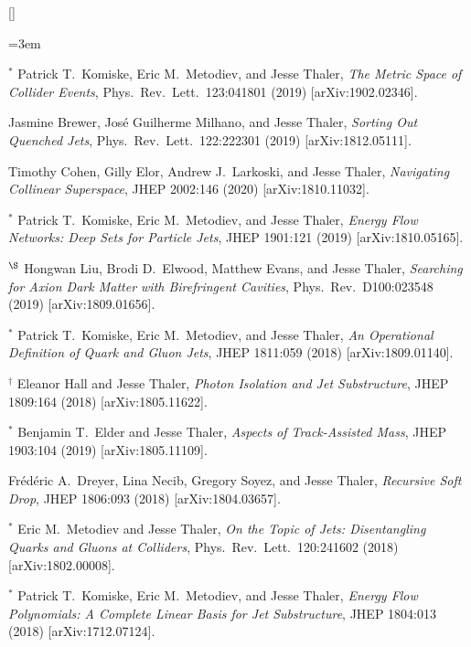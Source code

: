 \begin{list}{[]\addtocounter{jessecount}{-1}}{\leftmargin=3em \itemsep=4pt}
\item
${}^\ast$ Patrick T.\ Komiske, Eric M.\ Metodiev, and Jesse Thaler,
\emph{The Metric Space of Collider Events},
Phys.\ Rev.\ Lett.\ 123:041801 (2019)
[arXiv:1902.02346].

\item
 Jasmine Brewer, José Guilherme Milhano, and Jesse Thaler,
\emph{Sorting Out Quenched Jets},
Phys.\ Rev.\ Lett.\ 122:222301 (2019)
[arXiv:1812.05111].

\item
 Timothy Cohen, Gilly Elor, Andrew J.\ Larkoski, and Jesse Thaler,
\emph{Navigating Collinear Superspace},
JHEP 2002:146 (2020)
[arXiv:1810.11032].

\item
${}^\ast$ Patrick T.\ Komiske, Eric M.\ Metodiev, and Jesse Thaler,
\emph{Energy Flow Networks: Deep Sets for Particle Jets},
JHEP 1901:121 (2019)
[arXiv:1810.05165].

\item
${}^\S$ Hongwan Liu, Brodi D.\ Elwood, Matthew Evans, and Jesse Thaler,
\emph{Searching for Axion Dark Matter with Birefringent Cavities},
Phys.\ Rev.\ D100:023548 (2019)
[arXiv:1809.01656].

\item
${}^\ast$ Patrick T.\ Komiske, Eric M.\ Metodiev, and Jesse Thaler,
\emph{An Operational Definition of Quark and Gluon Jets},
JHEP 1811:059 (2018)
[arXiv:1809.01140].

\item
${}^\dagger$ Eleanor Hall and Jesse Thaler,
\emph{Photon Isolation and Jet Substructure},
JHEP 1809:164 (2018)
[arXiv:1805.11622].

\item
${}^\ast$ Benjamin T.\ Elder and Jesse Thaler,
\emph{Aspects of Track-Assisted Mass},
JHEP 1903:104 (2019)
[arXiv:1805.11109].

\item
 Frédéric A.\ Dreyer, Lina Necib, Gregory Soyez, and Jesse Thaler,
\emph{Recursive Soft Drop},
JHEP 1806:093 (2018)
[arXiv:1804.03657].

\item
${}^\ast$ Eric M.\ Metodiev and Jesse Thaler,
\emph{On the Topic of Jets: Disentangling Quarks and Gluons at Colliders},
Phys.\ Rev.\ Lett.\ 120:241602 (2018)
[arXiv:1802.00008].

\item
${}^\ast$ Patrick T.\ Komiske, Eric M.\ Metodiev, and Jesse Thaler,
\emph{Energy Flow Polynomials: A Complete Linear Basis for Jet Substructure},
JHEP 1804:013 (2018)
[arXiv:1712.07124].


\end{list}
